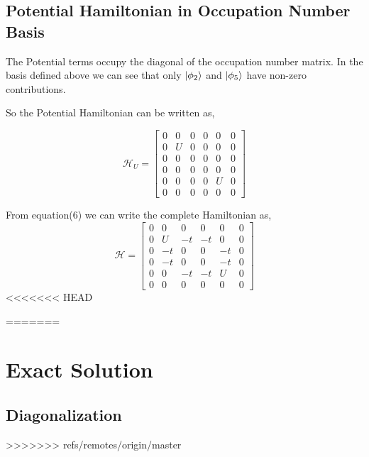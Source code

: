 \documentclass{article}
\begin{document}
\subsection{Potential Hamiltonian in Occupation Number Basis}
The Potential terms occupy the diagonal of the occupation number matrix. In the basis defined above we can see that
only \(\ket{\phi_2} \) and \(\ket{\phi_5}\) have non-zero contributions.

So the Potential Hamiltonian can be written as,

\begin{equation}
  \mathcal{H}_U =
  \begin{bmatrix}
    0 & 0 & 0 & 0 & 0 & 0 \\
    0 & U & 0 & 0 & 0 & 0 \\
    0 & 0 & 0 & 0 & 0 & 0 \\
    0 & 0 & 0 & 0 & 0 & 0 \\
    0 & 0 & 0 & 0 & U & 0 \\
    0 & 0 & 0 & 0 & 0 & 0
  \end{bmatrix}
\end{equation}

From equation(6) we can write the complete Hamiltonian as,
\begin{equation}
  \mathcal{H} =
  \begin{bmatrix}
    0 & 0 & 0 & 0 & 0 & 0   \\
    0 & U & -t & -t & 0 & 0 \\
    0 & -t & 0 & 0 & -t & 0 \\
    0 & -t & 0 & 0 & -t & 0 \\
    0 & 0 & -t & -t & U & 0 \\
    0 & 0 & 0 & 0 & 0 & 0
  \end{bmatrix}
\end{equation}
<<<<<<< HEAD

=======
\section{Exact Solution}
\subsection{Diagonalization}
>>>>>>> refs/remotes/origin/master
\end{document}
